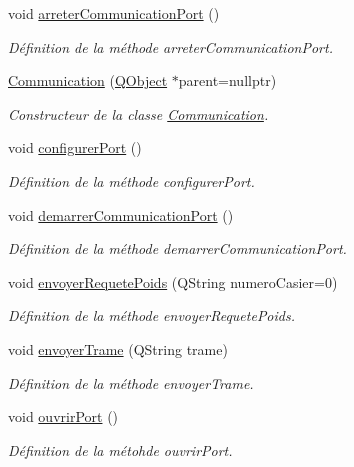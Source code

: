 \begin{DoxyCompactItemize}
\item 
void \hyperlink{class_communication_aa447a2fe9e2e5c2467a0816865a77340}{arreter\+Communication\+Port} ()
\begin{DoxyCompactList}\small\item\em Définition de la méthode arreter\+Communication\+Port. \end{DoxyCompactList}\item 
\hyperlink{class_communication_a56cf4b262e592bcae1d987c3dd00487f}{Communication} (\hyperlink{class_q_object}{Q\+Object} $\ast$parent=nullptr)
\begin{DoxyCompactList}\small\item\em Constructeur de la classe \hyperlink{class_communication}{Communication}. \end{DoxyCompactList}\item 
void \hyperlink{class_communication_ae39284eac0920a3d11c085b48c6234da}{configurer\+Port} ()
\begin{DoxyCompactList}\small\item\em Définition de la méthode configurer\+Port. \end{DoxyCompactList}\item 
void \hyperlink{class_communication_a8fe8d15efd2590a1061a015f5f761924}{demarrer\+Communication\+Port} ()
\begin{DoxyCompactList}\small\item\em Définition de la méthode demarrer\+Communication\+Port. \end{DoxyCompactList}\item 
void \hyperlink{class_communication_ab8f5efe1d44805be0081e986b2687a12}{envoyer\+Requete\+Poids} (Q\+String numero\+Casier=0)
\begin{DoxyCompactList}\small\item\em Définition de la méthode envoyer\+Requete\+Poids. \end{DoxyCompactList}\item 
void \hyperlink{class_communication_a53c26abe4c16ff155a15929dd5ad07cf}{envoyer\+Trame} (Q\+String trame)
\begin{DoxyCompactList}\small\item\em Définition de la méthode envoyer\+Trame. \end{DoxyCompactList}\item 
void \hyperlink{class_communication_ad5969603a6b7232d0227a461fd479251}{ouvrir\+Port} ()
\begin{DoxyCompactList}\small\item\em Définition de la métohde ouvrir\+Port. \end{DoxyCompactList}\item 

\end{DoxyCompactItemize}
